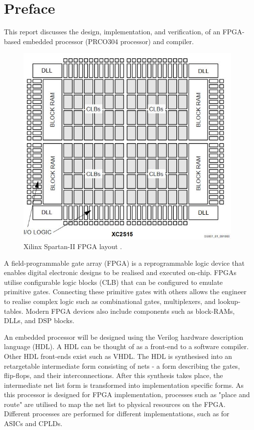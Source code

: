\documentclass[11pt,a4paper]{report}
\newcommand{\scname}{PRCO304}
\begin{document}
\newpage
\chapter*{Preface}
\label{sect:preface}
This report discusses the design, implementation, and verification, of an FPGA-based embedded processor (\scname{} processor) and compiler.

\begin{figure}[H]
\begin{center}
\includegraphics[scale=0.4]{fpga}
\end{center}
\caption{Xilinx Spartan-II FPGA layout \cite{spartan2}.}
\label{fig:}
\end{figure}

A field-programmable gate array (FPGA) is a reprogrammable logic device that enables digital electronic designs to be realised and executed on-chip. FPGAs utilise configurable logic blocks (CLB) that can be configured to emulate primitive gates. Connecting these primitive gates with others allows the engineer to realise complex logic such as combinational gates, multiplexers, and lookup-tables. Modern FPGA devices also include components such as block-RAMs, DLLs, and DSP blocks.

An embedded processor will be designed using the Verilog hardware description language (HDL). A HDL can be thought of as a front-end to a software compiler. Other HDL front-ends exist such as VHDL. The HDL is synthesised into an retargetable intermediate form consisting of nets - a form describing the gates, flip-flops, and their interconnections. After this synthesis takes place, the intermediate net list form is transformed into implementation specific forms. As this processor is designed for FPGA implementation, processes such as "place and route" are utilised to map the net list to physical resources on the FPGA. Different processes are performed for different implementations, such as for ASICs and CPLDs.
\end{document}
